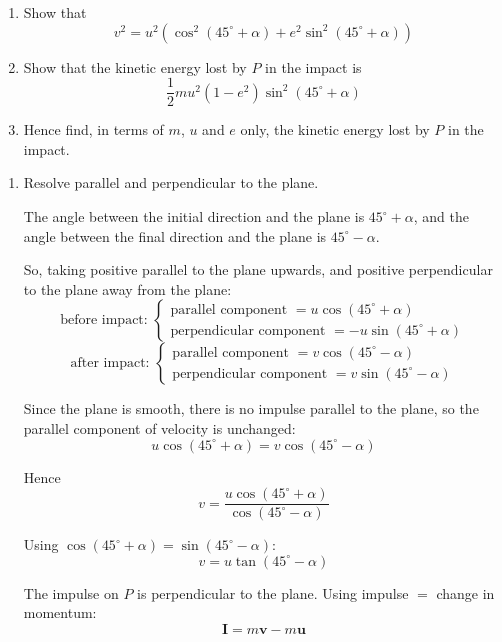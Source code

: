 \documentclass[leqno]{article}
\begin{document}
\begin{enumerate}[
  label=\textbf{\arabic*.},
  leftmargin=*,
  topsep=0pt,
  partopsep=0pt,
  parsep=0pt
]
\begin{enumerate}[label=\textbf{(\alph*)}, resume]
  \item Show that
  \[
  v^2=u^2\left(\cos^2(45^\circ+\alpha)+e^2\sin^2(45^\circ+\alpha)\right)
  \] 
  \item Show that the kinetic energy lost by $P$ in the impact is
  \[
  \dfrac{1}{2} m u^2 (1-e^2)\sin^2(45^\circ+\alpha)
  \] 
  \item Hence find, in terms of $m$, $u$ and $e$ only, the kinetic energy lost by $P$ in the impact.  \\
\end{enumerate}

\vspace*{10pt}

\begin{djsSolution}
\begin{enumerate}[label=\textbf{(\alph*)}]
\item Resolve parallel and perpendicular to the plane.

The angle between the initial direction and the plane is \(45^\circ+\alpha\), and the angle between the final direction and the plane is \(45^\circ-\alpha\).

So, taking positive parallel to the plane upwards, and positive perpendicular to the plane away from the plane:
\[
\text{before impact: }
\begin{cases}
\text{parallel component }=u\cos(45^\circ+\alpha) \\
\text{perpendicular component }=-u\sin(45^\circ+\alpha)
\end{cases}
\]
\[
\text{after impact: }
\begin{cases}
\text{parallel component }=v\cos(45^\circ-\alpha) \\
\text{perpendicular component }=v\sin(45^\circ-\alpha)
\end{cases}
\]

Since the plane is smooth, there is no impulse parallel to the plane, so the parallel component of velocity is unchanged:
\[
u\cos(45^\circ+\alpha)=v\cos(45^\circ-\alpha)
\]

Hence
\[
v=\frac{u\cos(45^\circ+\alpha)}{\cos(45^\circ-\alpha)}
\]

Using \(\cos(45^\circ+\alpha)=\sin(45^\circ-\alpha)\):
\[
v=u\tan(45^\circ-\alpha)
\]

The impulse on \(P\) is perpendicular to the plane. Using impulse \(=\) change in momentum:
\[
\mathbf{I}=m\mathbf{v}-m\mathbf{u}
\]


\end{enumerate}
\end{djsSolution}
\end{enumerate}
\end{document}
